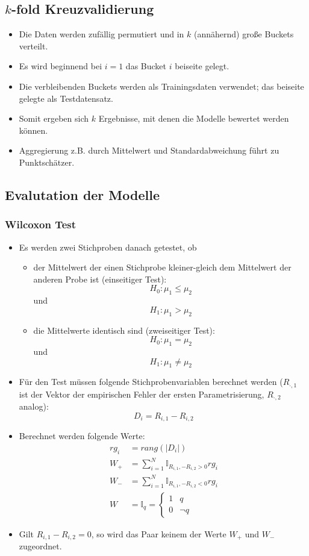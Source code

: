 \documentclass{scrartcl}
\begin{document}
\subsection{$ k $-fold Kreuzvalidierung}

\begin{itemize}
	\item Die Daten werden zufällig permutiert und in $ k $ (annähernd) große 
	Buckets verteilt.
	\item Es wird beginnend bei $ i=1 $ das Bucket $ i $ beiseite gelegt.
	\item Die verbleibenden Buckets werden als Trainingsdaten verwendet; das 
	beiseite gelegte als Testdatensatz.
	\item Somit ergeben sich $ k $ Ergebnisse, mit denen die Modelle bewertet 
	werden können.
	\item Aggregierung z.B. durch Mittelwert und Standardabweichung führt zu 
	Punktschätzer.
\end{itemize}

\subsection{Evalutation der Modelle}

\subsubsection{Wilcoxon Test}

\begin{itemize}
	\item Es werden zwei Stichproben danach getestet, ob
	\begin{itemize}
		\item der Mittelwert der einen Stichprobe kleiner-gleich dem Mittelwert 
		der anderen Probe ist (einseitiger Test):
		\[ H_0 : \mu_1 \leq \mu_2 \]
		und 
		\[ H_1 : \mu_1 > \mu_2 \]
		\item die Mittelwerte identisch sind (zweiseitiger Test):
		\[ H_0 : \mu_1 = \mu_2 \]
		und
		\[ H_1 : \mu_1 \neq \mu_2 \]
	\end{itemize}
	\item Für den Test müssen folgende Stichprobenvariablen berechnet werden ($ 
	R_{\cdot, 1} $ ist der Vektor der empirischen Fehler der ersten 
	Parametrisierung, $ R_{\cdot, 2} $ analog):
	\[ D_i = R_{i,1} - R_{i,2} \]
	\item Berechnet werden folgende Werte:
	\begin{align*}
		rg_i &= rang(|D_i|) \\
		W_+ &= \sum_{i=1}^{N} \mathbb{I}_{R_{i,1}, - R_{i,2} > 0} rg_i \\
		W_- &= \sum_{i=1}^{N} \mathbb{I}_{R_{i,1}, - R_{i,2} < 0} rg_i \\
		W &= \mathbb{I}_q = \begin{cases}
			1 & q \\
			0 & \neg q
		\end{cases}
	\end{align*}
	\item Gilt $ R_{i,1} - R_{i,2} = 0 $, so wird das Paar keinem der Werte $ 
	W_+ $ und $ W_- $ zugeordnet.
\end{itemize}
\end{document}
